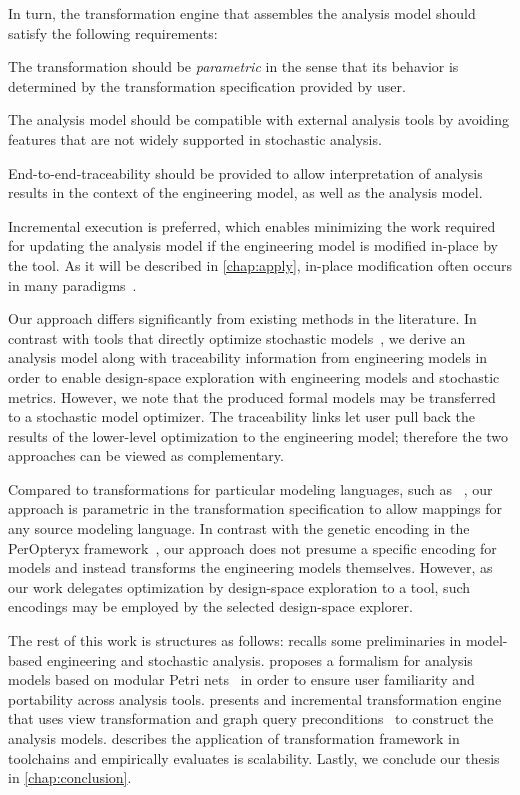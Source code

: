 In turn, the transformation engine that assembles the analysis model should satisfy the following requirements:
\begin{enumerate*}
\item The transformation should be \emph{parametric} in the sense that its behavior is determined by the transformation specification provided by user.
\item The analysis model should be compatible with external analysis tools by avoiding features that are not widely supported in stochastic analysis.
\item End-to-end-traceability should be provided to allow interpretation of analysis results in the context of the engineering model, as well as the analysis model.
\item Incremental execution is preferred, which enables minimizing the work required for updating the analysis model if the engineering model is modified in-place by the  tool. As it will be described in \cref{chap:apply}, in-place modification often occurs in many  paradigms~\citep{Vanherpen14patterns}.
\end{enumerate*}

Our approach differs significantly from existing methods in the literature. In contrast with tools that directly optimize stochastic models~, we derive an analysis model along with traceability information from engineering models in order to enable design-space exploration with engineering models and stochastic metrics. However, we note that the produced formal models may be transferred to a stochastic model optimizer. The traceability links let user pull back the results of the lower-level optimization to the engineering model; therefore the two approaches can be viewed as complementary.

Compared to transformations for particular modeling languages, such as ~, our approach is parametric in the transformation specification to allow mappings for any source modeling language. In contrast with the genetic encoding in the PerOpteryx framework~\citep{Koziolek11generic}, our approach does not presume a specific encoding for models and instead transforms the engineering models themselves. However, as our work delegates optimization by design-space exploration to a  tool, such encodings may be employed by the selected design-space explorer.

The rest of this work is structures as follows:  recalls some preliminaries in model-based engineering and stochastic analysis.  proposes a formalism for analysis models based on modular Petri nets~\citep{Kindler09modular} in order to ensure user familiarity and portability across analysis tools.  presents and incremental transformation engine that uses view transformation and graph query preconditions~\citep{Debreceni14viewmodel} to construct the analysis models.  describes the application of transformation framework in  toolchains and empirically evaluates is scalability. Lastly, we conclude our thesis in \cref{chap:conclusion}.

